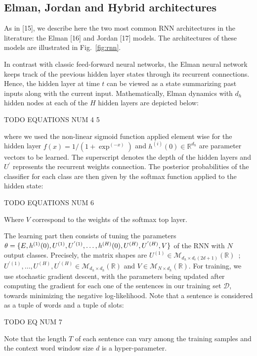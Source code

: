 \subsection{Elman, Jordan and Hybrid architectures}

As in [15], we describe here the two most common RNN architectures in the
literature: the Elman [16] and Jordan [17] models. The architectures of these
models are illustrated in Fig.~\ref{fig:rnn}.

In contrast with classic feed-forward neural networks, the Elman neural network
keeps track of the previous hidden layer states through its recurrent
connections. Hence, the hidden layer at time $t$ can be viewed as a state
summarizing past inputs along with the current input. Mathematically, Elman
dynamics with $d_h$ hidden nodes at each of the $H$ hidden layers are depicted
below:

TODO EQUATIONS NUM 4 5

where we used the non-linear sigmoid function applied element wise for the
hidden layer $f(x)=1/(1+\exp^(-x))$ and $h^{(i)} (0)\in\mathbb{R}^{d_h}$ are parameter vectors
to be learned. The superscript denotes the depth of the hidden layers and $U^{'}$
represents the recurrent weights connection. The posterior probabilities of the
classifier for each class are then given by the softmax function applied to the
hidden state:

TODO EQUATIONS NUM 6

Where $V$ correspond to the weights of the softmax top layer. 

The learning part then consists of tuning the parameters $\theta=\{ E, h^{(1)}
(0), U^{(1)}, \\ U^{'(1)},\dots,h^{(H)} (0), U^{(H)}, U^{'(H)} ,V \}$   of the RNN with $N$
output classes. Precisely, the matrix shapes are $U^{(1)}\in\mathcal{M}_{d_h\times d_e (2d+1)}
(\mathbb{R})$~;~ $U^{'(1)},\dots,U^{(H)}, U^{'(H)}\in\mathcal{M}_{d_h\times d_h} (\mathbb{R})$ and $V\in\mathcal{M}_{N\times d_h}(\mathbb{R})$. For
training, we use stochastic gradient descent, with the parameters being updated
after computing the gradient for each one of the sentences in our training set
$\mathcal{D}$, towards minimizing the negative log-likelihood. Note that a sentence is
considered as a tuple of words and a tuple of slots:

TODO EQ NUM 7

Note that the length $T$ of each sentence can vary among the training samples and
the context word window size $d$ is a hyper-parameter.  

